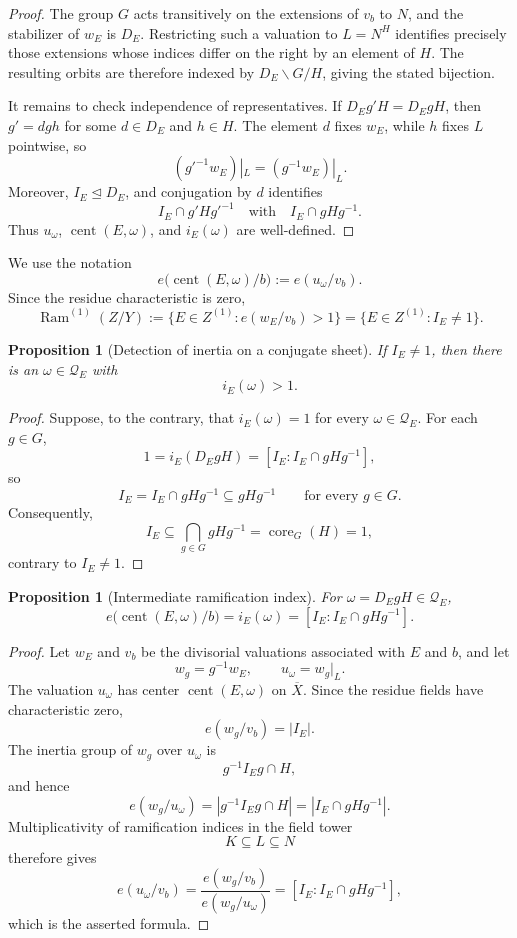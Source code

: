 \documentclass[11pt]{article}
\newtheorem{proposition}[theorem]{Proposition}
\theoremstyle{remark}
\theoremstyle{definition}
\DeclareMathOperator{\Ram}{Ram}
\DeclareMathOperator{\core}{core}
\begin{document}
\begin{proof}
The group \(G\) acts transitively on the extensions of \(v_b\) to \(N\),
and the stabilizer of \(w_E\) is \(D_E\).  Restricting such a valuation
to \(L=N^H\) identifies precisely those extensions whose indices differ
on the right by an element of \(H\).  The resulting orbits are therefore
indexed by \(D_E\backslash G/H\), giving the stated bijection.

It remains to check independence of representatives.  If
\(D_Eg'H=D_EgH\), then \(g'=dgh\) for some \(d\in D_E\) and \(h\in H\).
The element \(d\) fixes \(w_E\), while \(h\) fixes \(L\) pointwise, so
\[
  (g'^{-1}w_E)|_L=(g^{-1}w_E)|_L.
\]
Moreover, \(I_E\trianglelefteq D_E\), and conjugation by \(d\) identifies
\[
  I_E\cap g'Hg'^{-1}
  \quad\text{with}\quad
  I_E\cap gHg^{-1}.
\]
Thus \(u_\omega\), \(\operatorname{cent}(E,\omega)\), and
\(i_E(\omega)\) are
well-defined.
\end{proof}

We use the notation
\[
  e\bigl(\operatorname{cent}(E,\omega)/b\bigr):=e(u_\omega/v_b).
\]
Since the residue characteristic is zero,
\[
  \Ram^{(1)}(Z/Y)
  :=
  \{E\in Z^{(1)}:e(w_E/v_b)>1\}
  =
  \{E\in Z^{(1)}:I_E\neq1\}.
\]

\begin{proposition}[Detection of inertia on a conjugate sheet]
\label{prop:core-free-sheet-action}
If \(I_E\neq1\), then there is an \(\omega\in\mathcal Q_E\) with
\[
  i_E(\omega)>1.
\]
\end{proposition}

\begin{proof}
Suppose, to the contrary, that \(i_E(\omega)=1\) for every
\(\omega\in\mathcal Q_E\).  For each \(g\in G\),
\[
  1=i_E(D_EgH)=[I_E:I_E\cap gHg^{-1}],
\]
so
\[
  I_E=I_E\cap gHg^{-1}\subseteq gHg^{-1}
  \qquad\text{for every }g\in G.
\]
Consequently,
\[
  I_E
  \subseteq
  \bigcap_{g\in G}gHg^{-1}
  =
  \core_G(H)
  =
  1,
\]
contrary to \(I_E\neq1\).
\end{proof}

\begin{proposition}[Intermediate ramification index]
\label{prop:intermediate-ramification-index}
For \(\omega=D_EgH\in\mathcal Q_E\),
\[
  e\bigl(\operatorname{cent}(E,\omega)/b\bigr)
  =
  i_E(\omega)
  =
  [I_E:I_E\cap gHg^{-1}].
\]
\end{proposition}

\begin{proof}
Let \(w_E\) and \(v_b\) be the divisorial valuations associated with
\(E\) and \(b\), and let
\[
  w_g=g^{-1}w_E,
  \qquad
  u_\omega=w_g|_L.
\]
The valuation \(u_\omega\) has center \(\operatorname{cent}(E,\omega)\) on
\(\overline X\).  Since
the residue fields have characteristic zero,
\[
  e(w_g/v_b)=|I_E|.
\]
The inertia group of \(w_g\) over \(u_\omega\) is
\[
  g^{-1}I_Eg\cap H,
\]
and hence
\[
  e(w_g/u_\omega)
  =
  |g^{-1}I_Eg\cap H|
  =
  |I_E\cap gHg^{-1}|.
\]
Multiplicativity of ramification indices in the field tower
\[
  K\subseteq L\subseteq N
\]
therefore gives
\[
  e(u_\omega/v_b)
  =
  \frac{e(w_g/v_b)}{e(w_g/u_\omega)}
  =
  [I_E:I_E\cap gHg^{-1}],
\]
which is the asserted formula.
\end{proof}
\end{document}
